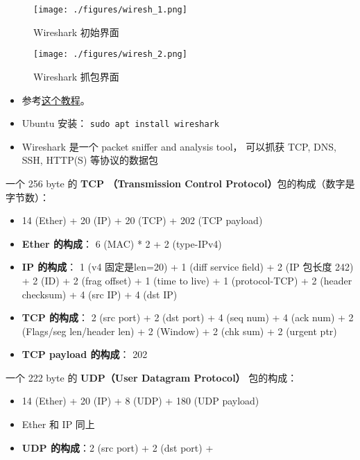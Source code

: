 
\begin{issues}
\issueDraft
\end{issues}

\begin{figure}[ht]
\centering
\texttt{[image: ./figures/wiresh\_1.png]}
\caption{Wireshark 初始界面} \label{wiresh_fig1}
\end{figure}

\begin{figure}[ht]
\centering
\texttt{[image: ./figures/wiresh\_2.png]}
\caption{Wireshark 抓包界面} \label{wiresh_fig2}
\end{figure}


\begin{itemize}
\item 参考\href{https://www.varonis.com/blog/how-to-use-wireshark}{这个教程}。
\item Ubuntu 安装： \verb|sudo apt install wireshark|
\item Wireshark 是一个 packet sniffer and analysis tool， 可以抓获 TCP, DNS, SSH, HTTP(S)   等协议的数据包
\end{itemize}

一个 256 byte 的 \textbf{TCP （Transmission Control Protocol）}包的构成（数字是字节数）：
\begin{itemize}
\item 14 (Ether) + 20 (IP) + 20 (TCP) + 202 (TCP payload)
\item \textbf{Ether 的构成}： 6 (MAC) * 2 + 2 (type-IPv4)
\item \textbf{IP 的构成}： 1 (v4 固定是len=20) + 1 (diff service field) + 2 (IP 包长度 242) + 2 (ID) + 2 (frag offset) + 1 (time to live) + 1 (protocol-TCP) + 2 (header checksum) + 4 (src IP) + 4 (dst IP)
\item \textbf{TCP 的构成}： 2 (src port) + 2 (dst port) + 4 (seq num) + 4 (ack num) + 2 (Flags/seg len/header len) + 2 (Window) + 2 (chk sum) + 2 (urgent ptr)
\item \textbf{TCP payload 的构成}： 202
\end{itemize}

一个 222 byte 的 \textbf{UDP（User Datagram Protocol）} 包的构成：
\begin{itemize}
\item 14 (Ether) + 20 (IP) + 8 (UDP) + 180 (UDP payload)
\item Ether 和 IP 同上
\item \textbf{UDP 的构成}：2 (src port) + 2 (dst port) + 
\end{itemize}
